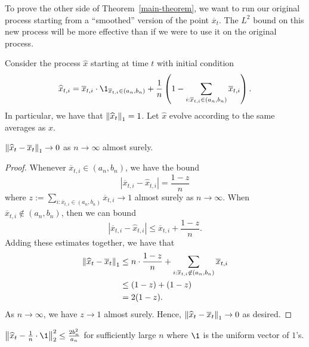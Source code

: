 \documentclass[12pt]{article}
\begin{document}
To prove the other side of Theorem~\ref{main-theorem}, we want to run our original process starting from a ``smoothed'' version of the point $\overline{x}_t$. The $L^2$ bound on this new process will be more effective than if we were to use it on the original process. 
\begin{defn}
	Consider the process $\widehat{x}$ starting at time $t$ with initial condition
	\[
		\widehat{x}_{t, i} = \overline{x}_{t, i} \cdot \1_{\overline{x}_{t, i} \in (a_n, b_n)} + \frac{1}{n} \left ( 1 - \sum_{i : \overline{x}_{t, i} \in (a_n, b_n)} \overline{x}_{t, i} \right ).
	\]
	In particular, we have that $\left\lVert \widehat{x}_t \right\rVert_1 = 1$. Let $\widehat{x}$ evolve according to the same averages as $x$. 
\end{defn}

\begin{lem}
	$\left\lVert \widehat{x}_t - \overline{x}_t \right\rVert_1 \to 0$ as $n \to \infty$ almost surely. 
\end{lem}
\begin{proof}
	Whenever $\overline{x}_{t, i} \in (a_n, b_n)$, we have the bound
	\[
		|\overline{x}_{t, i} - \widehat{x}_{t, i}| = \frac{1 - z}{n}
	\]
	where $z := \sum_{i : \overline{x}_{t, i} \in (a_n, b_n)} \overline{x}_{t, i} \to 1$ almost surely as $n \to \infty$. When $\overline{x}_{t, i} \not\in (a_n, b_n)$, then we can bound
	\[
		| \overline{x}_{t,i} - \widehat{x}_{t, i}| \leq \overline{x}_{t, i} + \frac{1-z}{n}.
	\]
	Adding these estimates together, we have that
	\begin{align*}
		\left\lVert \widehat{x}_t - \overline{x}_t \right\rVert_1 & \leq n \cdot \frac{1-z}{n} + \sum_{i : \overline{x}_{t, i} \not\in (a_n, b_n)} \overline{x}_{t, i} \\
		& \leq (1-z) + (1 - z) \\
		& = 2(1-z).
	\end{align*}
	As $n \to \infty$, we have $z \to 1$ almost surely. Hence, $\left\lVert \widehat{x}_t - \overline{x}_t \right\rVert_1 \to 0$ as desired. 
\end{proof}
\begin{lem}
	$\norm{\widehat{x}_t - \frac{1}{n} \cdot \1}_2^2 \leq \frac{2b_n^2}{a_n}$ for sufficiently large $n$ where $\1$ is the uniform vector of $1$'s.
\end{lem}
\end{document}
